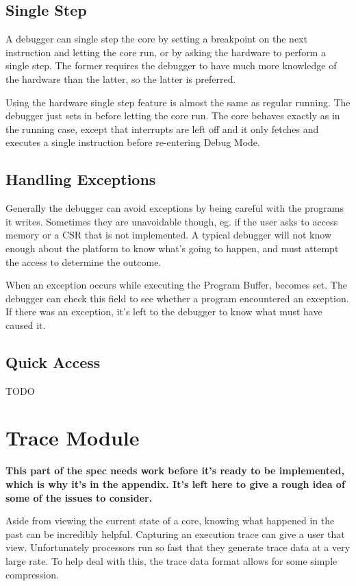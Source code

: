 \documentclass{article}
\begin{document}
\subsection{Single Step}

A debugger can single step the core by setting a breakpoint on the next
instruction and letting the core run, or by asking the hardware to perform a
single step. The former requires the debugger to have much more knowledge of
the hardware than the latter, so the latter is preferred.

Using the hardware single step feature is almost the same as regular running.
The debugger just sets \Fstep in \Rdcsr before letting the core run. The core
behaves exactly as in the running case, except that interrupts are left off and
it only fetches and executes a single instruction before re-entering Debug
Mode.

\subsection{Handling Exceptions}

Generally the debugger can avoid exceptions by being careful with the programs
it writes. Sometimes they are unavoidable though, eg. if the user asks to
access memory or a CSR that is not implemented. A typical debugger will not
know enough about the platform to know what's going to happen, and must attempt
the access to determine the outcome.

When an exception occurs while executing the Program Buffer, \Fcmderr becomes
set. The debugger can check this field to see whether a program encountered an
exception.  If there was an exception, it's left to the debugger to know what
must have caused it.

\subsection{Quick Access} \label{quickaccess}

TODO

\section{Trace Module}

{\bf This part of the spec needs work before it's ready to be implemented,
which is why it's in the appendix. It's left here to give a rough idea of some
of the issues to consider.}

Aside from viewing the current state of a core, knowing what happened in the
past can be incredibly helpful. Capturing an execution trace can give a user
that view.  Unfortunately processors run so fast that they generate trace data
at a very large rate. To help deal with this, the trace data format allows for
some simple compression.
\end{document}
